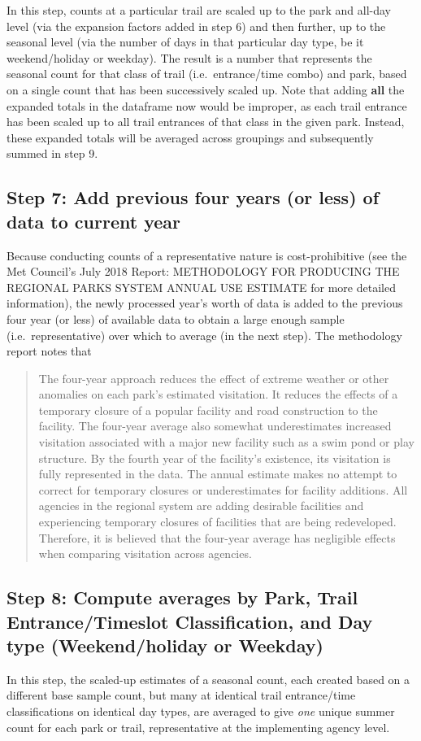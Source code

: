 \documentclass[]{article}
\begin{document}
In this step, counts at a particular trail are scaled up to the park and
all-day level (via the expansion factors added in step 6) and then
further, up to the seasonal level (via the number of days in that
particular day type, be it weekend/holiday or weekday). The result is a
number that represents the seasonal count for that class of trail
(i.e.~entrance/time combo) and park, based on a single count that has
been successively scaled up. Note that adding \textbf{all} the expanded
totals in the dataframe now would be improper, as each trail entrance
has been scaled up to all trail entrances of that class in the given
park. Instead, these expanded totals will be averaged across groupings
and subsequently summed in step 9.

\subsection{Step 7: Add previous four years (or less) of data to current
year}\label{step-7-add-previous-four-years-or-less-of-data-to-current-year}

Because conducting counts of a representative nature is cost-prohibitive
(see the Met Council's July 2018 Report: METHODOLOGY FOR PRODUCING THE
REGIONAL PARKS SYSTEM ANNUAL USE ESTIMATE for more detailed
information), the newly processed year's worth of data is added to the
previous four year (or less) of available data to obtain a large enough
sample (i.e.~representative) over which to average (in the next step).
The methodology report notes that

\begin{quote}
The four-year approach reduces the effect of extreme weather or other
anomalies on each park's estimated visitation. It reduces the effects of
a temporary closure of a popular facility and road construction to the
facility. The four-year average also somewhat underestimates increased
visitation associated with a major new facility such as a swim pond or
play structure. By the fourth year of the facility's existence, its
visitation is fully represented in the data. The annual estimate makes
no attempt to correct for temporary closures or underestimates for
facility additions. All agencies in the regional system are adding
desirable facilities and experiencing temporary closures of facilities
that are being redeveloped. Therefore, it is believed that the four-year
average has negligible effects when comparing visitation across
agencies.
\end{quote}

\subsection{Step 8: Compute averages by Park, Trail Entrance/Timeslot
Classification, and Day type (Weekend/holiday or
Weekday)}\label{step-8-compute-averages-by-park-trail-entrancetimeslot-classification-and-day-type-weekendholiday-or-weekday}

In this step, the scaled-up estimates of a seasonal count, each created
based on a different base sample count, but many at identical trail
entrance/time classifications on identical day types, are averaged to
give \emph{one} unique summer count for each park or trail,
representative at the implementing agency level.
\end{document}
